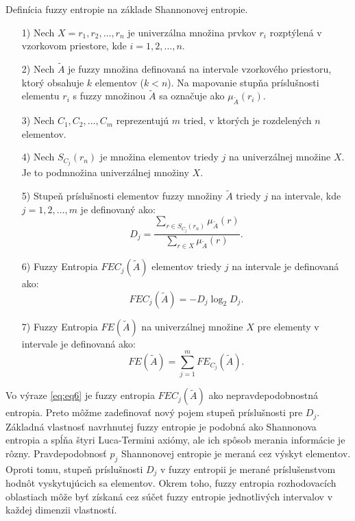 \begin{defn}Definícia fuzzy entropie na základe Shannonovej entropie. 
\begin{itemize}
	\item[1)] Nech $X={r_1,r_2,\ldots,r_n}$ je univerzálna množina prvkov $r_i$ rozptýlená v vzorkovom priestore, kde   $i=1,2, \ldots, n$. 
	
	\item[2)]
	Nech $\tilde{A}$  je fuzzy množina definovaná na intervale vzorkového priestoru, ktorý obsahuje $k$ elementov ($k<n$). Na mapovanie stupňa príslušnosti elementu $r_i$
	s fuzzy množinou $\tilde{A}$  sa označuje ako 
	$\mu_{\tilde{A}}(r_i)$. 
	
	\item[3)]
	Nech $C_1, C_2, \ldots,C_m$  reprezentujú $m$  tried, v ktorých je rozdelených $n$ elementov. 
	
	\item[4)]
	Nech $S_{C_j}(r_n)$  je množina elementov triedy  $j$  na univerzálnej množine $X$.
	Je to podmnožina univerzálnej množiny $X$. 
	
	\item[5)]
	Stupeň príslušnosti elementov fuzzy množiny $\tilde{A}$
	triedy $j$ na intervale, kde $j=1,2,\ldots,m$
	je definovaný ako: 
	\begin{equation}
	{D_j} = \frac{
		\sum\limits_{r\in S_{C_j}(r_n)}
		\mu_{\tilde{A}}(r)
	}{
		\sum\limits_{r \in X}
		\mu_{\tilde{A}}
		\left(r\right)
	}. 
	\end{equation}
	
	\item[6)]
	Fuzzy Entropia $FEC_j(\tilde{A})$ elementov triedy $j$
	na intervale je definovaná ako: 
	\begin{equation}\label{eq:eq6}
	FEC_j(\tilde{A}) = -D_j \log_2D_j.
	\end{equation}
	\item[7)]
	Fuzzy Entropia $FE(\tilde{A})$ na univerzálnej množine $X$
	pre elementy v intervale je definovaná ako: 
	$$
	FE(\tilde{A}) = \sum\limits_{j=1}^m FE_{C_j}(\tilde{A}). 
	$$
	
\end{itemize}
\end{defn}


Vo výraze \ref{eq:eq6} je fuzzy entropia $FEC_j(\tilde{A})$  ako nepravdepodobnostná entropia. Preto môžme zadefinovať nový pojem stupeň príslušnosti pre $D_j$. Základná vlastnosť navrhnutej fuzzy entropie je podobná ako Shannonova entropia a spĺňa štyri Luca-Termini axiómy, ale ich spôsob merania informácie je rôzny. Pravdepodobnosť $p_j$ Shannonovej entropie je meraná cez výskyt elementov. Oproti tomu, stupeň príslušnosti $D_j$ v fuzzy entropii je merané príslušenstvom hodnôt vyskytujúcich sa elementov. Okrem toho, fuzzy entropia rozhodovacích oblastiach môže byť získaná cez súčet fuzzy entropie jednotlivých intervalov v každej dimenzii vlastností. \cite{lee2001}

